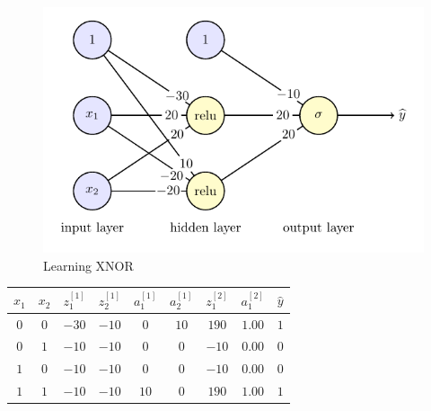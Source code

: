 \documentclass{beamer}
\begin{document}
\begin{frame}{}
    \begin{figure}
        \includegraphics[scale=0.69]{./xnor/xnor.pdf}
        \caption{Learning XNOR}
    \end{figure}

    \begin{center}
    \begin{tabular}{cc|cccc|cc|c}
        $x_1$ & $x_2$ & $z_1^{[1]}$ & $z_2^{[1]}$ & $a_1^{[1]}$ & $a_2^{[1]}$ & $z_1^{[2]}$ & $a_1^{[2]}$ & $\widehat{y}$\\\hline
        $0$ & $0$ & $-30$ & $-10$ & $0$ & $10$ & $190$ & $1.00$ & $1$\\ 
        $0$ & $1$ & $-10$ & $-10$ & $0$ & $0$ & $-10$ & $0.00$ & $0$ \\ 
        $1$ & $0$ & $-10$ & $-10$ & $0$ & $0$ & $-10$ & $0.00$ & $0$\\
        $1$ & $1$ & $-10$ & $-10$ & $10$ & $0$ & $190$ & $1.00$ & $1$
    \end{tabular}
\end{center}
\end{frame}
\end{document}
